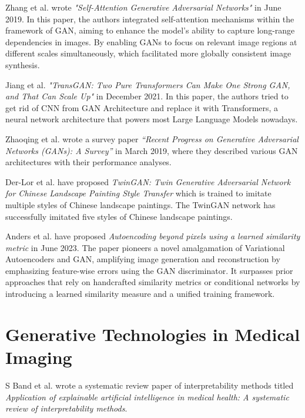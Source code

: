 Zhang et al. wrote \textit{"Self-Attention Generative Adversarial Networks"}\cite{SAGAN} in June 2019. In this paper, the authors integrated self-attention mechanisms within the framework of GAN, aiming to enhance the model's ability to capture long-range dependencies in images. By enabling GANs to focus on relevant image regions at different scales simultaneously, which facilitated more globally consistent image synthesis. 

\noindent
Jiang et al. \textit{"TransGAN: Two Pure Transformers Can Make One Strong GAN, and That Can Scale Up"}\cite{TransGAN} in December 2021. In this paper, the authors tried to get rid of CNN from GAN Architecture and replace it with Transformers, a neural network architecture that powers most Large Language Models nowadays.

\noindent
Zhaoqing et al. wrote a survey paper \textit{“Recent Progress on Generative Adversarial Networks (GANs): A Survey”}\cite{Recent_Progress} in  March 2019, where they described various GAN architectures with their performance analyses.

\noindent
Der-Lor et al. have proposed \textit{TwinGAN: Twin Generative Adversarial Network for Chinese Landscape Painting Style Transfer}\cite{TwinGAN} which is trained to imitate multiple styles of Chinese landscape paintings. The TwinGAN network has successfully imitated five styles of Chinese landscape paintings.


\noindent
Anders et al. have proposed \textit{Autoencoding beyond pixels using a learned similarity metric}\cite{VAEGAN} in June 2023. The paper pioneers a novel amalgamation of Variational Autoencoders and GAN, amplifying image generation and reconstruction by emphasizing feature-wise errors using the GAN discriminator. It surpasses prior approaches that rely on handcrafted similarity metrics or conditional networks by introducing a learned similarity measure and a unified training framework.

\section{Generative Technologies in Medical Imaging}

S Band et al. wrote a systematic review paper of interpretability methods titled \textit{Application of explainable artificial intelligence in medical health: A systematic review of interpretability methods}\cite{XAI}. 

\clearpage

